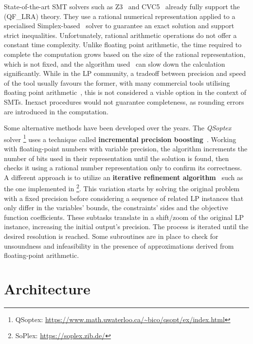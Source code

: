 \documentclass[runningheads]{llncs}
\begin{document}
State-of-the-art SMT solvers such as Z3~\cite{ref:z3} and CVC5~\cite{ref:cvc5} already fully support the (QF\_LRA) theory.
They use a rational numerical representation applied to a specialised Simplex-based~\cite{ref:simplex} solver to guarantee an exact solution and support strict inequalities.
Unfortunately, rational arithmetic operations do not offer a constant time complexity. %
Unlike floating point arithmetic, the time required to complete the computation grows based on the size of the rational representation, which is not fixed, and the algorithm used~\cite{ref:fft-mult} can slow down the calculation significantly.
While in the LP community, a tradeoff between precision and speed of the tool usually favours the former, with many commercial tools utilising floating point arithmetic~\cite{ref:gurobi}, this is not considered a viable option in the context of SMTs.
Inexact procedures would not guarantee completeness, as rounding errors are introduced in the computation.

Some alternative methods have been developed over the years.
The \textit{QSoptex} solver \footnote{QSoptex: \url{https://www.math.uwaterloo.ca/~bico/qsopt/ex/index.html}} uses a technique called \textbf{incremental precision boosting}~\cite{ref:precision-boosting}.
Working with floating-point numbers with variable precision, the algorithm increments the number of bits used in their representation until the solution is found, then checks it using a rational number representation only to confirm its correctness.
A different approach is to utilize an \textbf{iterative refinement algorithm}~\cite{ref:iterative-refinement} such as the one implemented in \soplex \footnote{SoPlex: \url{https://soplex.zib.de/}}.
This variation starts by solving the original problem with a fixed precision before considering a sequence of related LP instances that only differ in the variables' bounds, the constraints' sides and the objective function coefficients.
These subtasks translate in a shift/zoom of the original LP instance, increasing the initial output's precision.
The process is iterated until the desired resolution is reached.
Some subroutines are in place to check for unsoundness and infeasibility in the presence of approximations derived from floating-point arithmetic.

\section{Architecture}
\label{sec:architecture}
\end{document}
